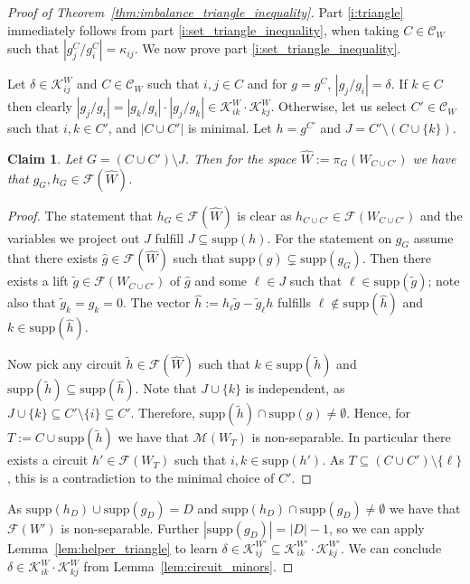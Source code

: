 \documentclass[11pt, a4paper]{article}
\newcommand{\Le}{\kappa}
\newcommand{\circuits}{\mathcal{C}}
\newcommand{\supp}{\mathrm{supp}}
\newcommand{\1}{\mathbbm{1}}
\newcommand{\KK}{\mathcal K}
\newcommand{\EE}{\mathcal F}
\newtheorem{claim}{Claim}[theorem]
\theoremstyle{case}
\begin{document}
\begin{proof}[Proof of Theorem~\ref{thm:imbalance_triangle_inequality}]
  \label{proof:lem:imbalance_triangle_inequality}
Part \ref{i:triangle} immediately follows from part \ref{i:set_triangle_inequality}, when taking
 $C \in \circuits_W$ such that $|g_j^C/g_i^C| = \Le_{ij}$. We now prove part \ref{i:set_triangle_inequality}.
 
 Let $\delta \in \KK_{ij}^W$ and $C\in \circuits_W$ such that $i,j\in C$ and for $g=g^C$, $|g_j/g_i| = \delta$. If $k \in C$ then clearly $|g_j/g_i| = |g_k/g_i| \cdot |g_j/g_k| \in \KK_{ik}^W\cdot \KK_{kj}^W$. Otherwise,
 let us select $C'\in \circuits_W$ such that $i,k\in C'$, and $|C\cup C'|$ is minimal. Let $h=g^{C'}$ and $J=C'\setminus (C\cup\{k\})$.
 
\begin{claim}
Let $G = (C \cup C') \setminus J$. Then for the space
$\hat W := \pi_{G}(W_{C \cup C'})$ we have that $g_G, h_G \in \EE(\hat W)$. 
\end{claim}
\begin{proof}
The statement that $h_G \in \EE(\hat W)$ is clear as $h_{C \cup C'} \in \EE (W_{C \cup C'})$ and the variables we project out $J$ fulfill $J \subseteq \supp(h)$.
For the statement on $g_G$ assume that there exists $\hat g \in \EE(\hat W)$ such that $\supp(\hat g) \subsetneq \supp(g_G)$. Then there exists a lift  $\tilde g \in \EE(W_{C \cup C'})$ of $\hat g$ and some $\ell \in J$ such that $\ell \in \supp(\tilde g)$; note also that $\tilde g_k = g_k = 0$. The vector $\hat h := h_\ell \tilde g - \tilde g_\ell h$ fulfills $\ell \notin \supp(\hat h)$ and $k \in \supp(\hat h)$.

Now pick any circuit $\tilde h \in \EE(\hat W)$ such that $k \in \supp(\tilde h)$ and $\supp(\tilde h) \subseteq \supp(\hat h)$. 
Note that $J \cup \{k\}$ is independent, as $J \cup \{k\} \subseteq C' \setminus \{i\} \subsetneq C'$. Therefore, $\supp(\tilde h) \cap \supp(g) \neq \emptyset$.
Hence, for $T := C \cup \supp(\tilde h)$ we have that $\mathcal M(W_T)$ is non-separable. In particular there exists a circuit $h' \in \EE(W_T)$ such that $i,k \in \supp(h')$. As $T \subseteq (C \cup C')\setminus \{\ell\}$, this is a contradiction to the minimal choice of $C'$.  
\end{proof}
As $\supp(h_D) \cup \supp(g_D) = D$ and $\supp(h_D) \cap \supp(g_D) \neq \emptyset$ we have that $\EE(W')$ is non-separable. Further $|\supp(g_D)| = |D| - 1$, so we can apply Lemma~\ref{lem:helper_triangle} to learn $\delta \in \KK_{ij}^{W'} \subseteq \KK_{ik}^{W'} \cdot \KK_{kj}^{W'}$. We can conclude   $\delta \in \KK_{ik}^W \cdot \KK_{kj}^W$ from Lemma~\ref{lem:circuit_minors}.
\end{proof}
\end{document}
